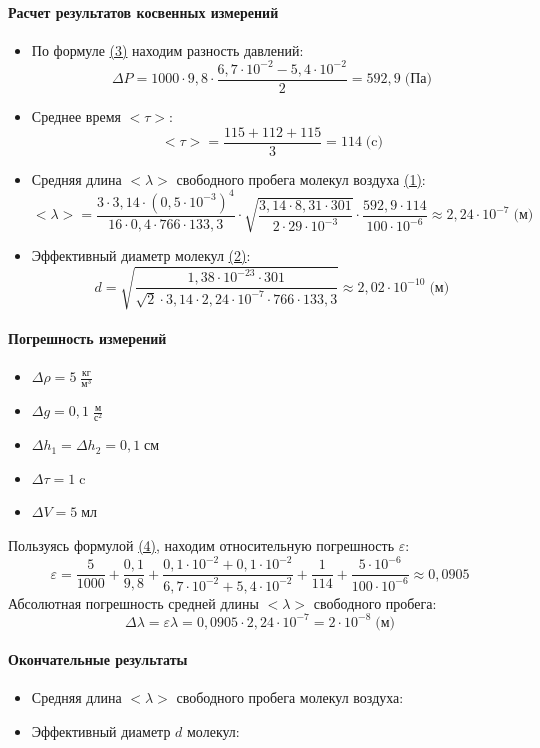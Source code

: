 \documentclass{article}
\begin{document}
\paragraph{Расчет результатов косвенных измерений}
\begin{itemize}
	\item По формуле \hyperlink{formuls}{(3)} находим разность давлений:
	$$ \Delta P=1000\cdot9,8\cdot\frac{6,7\cdot10^{-2}-5,4\cdot10^{-2}}{2}=592,9\;\mbox{(Па)}$$
	\item Среднее время $<\tau>$:
	$$<\tau>=\frac{115+112+115}{3}=114\;\mbox{(c)}$$
	\item Средняя длина $<\lambda>$ свободного пробега молекул воздуха \hyperlink{formuls}{(1)}:
	$$<\lambda>=\frac{3\cdot3,14\cdot(0,5\cdot10^{-3})^4}{16\cdot0,4\cdot766\cdot133,3}\cdot\sqrt{\frac{3,14\cdot8,31\cdot301}{2\cdot29\cdot10^{-3}}}\cdot\frac{592,9\cdot114}{100\cdot10^{-6}}\approx2,24\cdot10^{-7}\;\mbox{(м)}$$
	\item Эффективный диаметр молекул \hyperlink{formuls}{(2)}:
	$$d=\sqrt{\frac{1,38\cdot10^{-23}\cdot301}{\sqrt{2}\cdot3,14\cdot2,24\cdot10^{-7}\cdot766\cdot133,3}}\approx2,02\cdot10^{-10}\;\mbox{(м)}$$
\end{itemize}

\paragraph{Погрешность измерений}
\begin{itemize}
\item $\Delta\rho=5\;\frac{\mbox{кг}}{\mbox{м}^3}$
\item$\Delta g=0,1\;\frac{\mbox{м}}{\mbox{с}^2}$
\item$\Delta h_1=\Delta h_2=0,1\;\mbox{см}$
\item$\Delta \tau=1\;\mbox{c}$
\item$\Delta V=5\;\mbox{мл}$
\end{itemize}
Пользуясь формулой \hyperlink{formuls}{(4)}, находим относительную погрешность $\varepsilon$:
$$\varepsilon=\frac{5}{1000}+\frac{0,1}{9,8}+\frac{0,1\cdot10^{-2}+0,1\cdot10^{-2}}{6,7\cdot10^{-2}+5,4\cdot10^{-2}}+\frac{1}{114}+\frac{5\cdot10^{-6}}{100\cdot10^{-6}}\approx0,0905$$
Абсолютная погрешность средней длины $<\lambda>$  свободного пробега:
$$\Delta \lambda=\varepsilon\lambda=0,0905\cdot2,24\cdot10^{-7}=2\cdot10^{-8}\;\mbox{(м)}$$
\paragraph{Окончательные результаты}
\begin{itemize}
	\item Средняя длина $<\lambda>$ свободного пробега молекул воздуха:
	\begin{center}
	\end{center}
	
	\item Эффективный диаметр $d$ молекул:
	\begin{center}
	\end{center}

\end{itemize}
\end{document}
